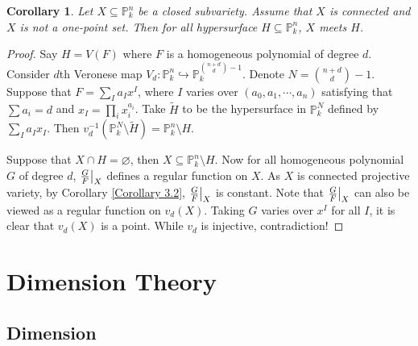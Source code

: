 \documentclass{ctexart}
\newtheorem{corollary}{Corollary}[section]
\begin{document}
\begin{corollary}
    Let $X \subseteq \mathbb{P}_{k}^{n}$ be a closed subvariety.
    Assume that $X$ is connected and $X$ is not a one-point set.
    Then for all hypersurface $H \subseteq \mathbb{P}_{k}^{n}$, $X$ meets $H$.
    \label{Corollary 3.3}
\end{corollary}
\begin{proof}
    Say $H = V(F)$ where $F$ is a homogeneous polynomial of degree $d$.
    Consider $d$th Veronese map $V_{d}: \mathbb{P}_{k}^{n} \hookrightarrow \mathbb{P}_{k}^{\binom{n + d}{d} - 1}$.
    Denote $N = \binom{n + d}{d} - 1$.
    Suppose that $F = \sum_{I} a_{I}x^{I}$, where $I$ varies over $(a_{0}, a_{1}, \cdots, a_{n})$ satisfying that $\sum a_{i} = d$ and $x_{I} = \prod_{i} x_{i}^{a_{i}}$.
    Take $\widetilde{H}$ to be the hypersurface in $\mathbb{P}_{k}^{N}$ defined by $\sum_{I} a_{I}x_{I}$.
    Then $v_{d}^{-1}(\mathbb{P}_{k}^{N} \setminus \widetilde{H}) = \mathbb{P}_{k}^{n} \setminus H$.
    \par
    Suppose that $X \cap H = \varnothing$, then $X \subseteq \mathbb{P}_{k}^{n} \setminus H$.
    Now for all homogeneous polynomial $G$ of degree $d$, $\frac{G}{F}\big{|}_{X}$ defines a regular function on $X$.
    As $X$ is connected projective variety, by Corollary \ref{Corollary 3.2}, $\frac{G}{F}\big{|}_{X}$ is constant.
    Note that $\frac{G}{F}\big{|}_{X}$ can also be viewed as a regular function on $v_{d}(X)$.
    Taking $G$ varies over $x^{I}$ for all $I$, it is clear that $v_{d}(X)$ is a point.
    While $v_{d}$ is injective, contradiction!
\end{proof}

\section{Dimension Theory}
\label{section:Dimension_Theory}
 
\subsection{Dimension}
\label{subsection:Dimension_Theory_Dimension}
\end{document}
